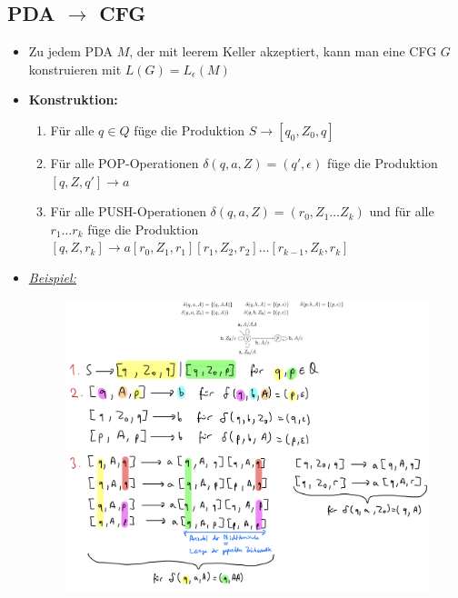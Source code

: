 \documentclass[ieeetran]{article}
\begin{document}
\subsection{PDA $\rightarrow$ CFG} %
\label{sub:pDA_rightarrow_cFG}
\begin{itemize}
	\item Zu jedem PDA $M$, der mit leerem Keller akzeptiert, kann man eine CFG $G$ konstruieren mit $L(G) = L_{\epsilon}(M)$
\item \textbf{Konstruktion:}
	\begin{enumerate}
		\item Für alle $q \in Q$ füge die Produktion $S \rightarrow [q_0, Z_0, q]$
		\item Für alle POP-Operationen $\delta(q, a, Z) = (q', \epsilon)$ füge die Produktion $[q,Z,q'] \rightarrow a$
		\item Für alle PUSH-Operationen $\delta(q, a, Z) = (r_0, Z_1 \ldots Z_k)$ und für alle $r_1 \ldots r_k$ füge die Produktion $[q, Z, r_k] \rightarrow a[r_0, Z_1, r_1][r_1, Z_2, r_2] \ldots [r_{k-1}, Z_k, r_k]$
	\end{enumerate}

\pagebreak
\item \textit{\underline{Beispiel:}}
	\begin{figure}[h!]
	  \centering
	  \includegraphics[width=1.0\linewidth]{pdatocfg}
	  \label{fig:pdatocfg}
	\end{figure}
\end{itemize}
\end{document}
